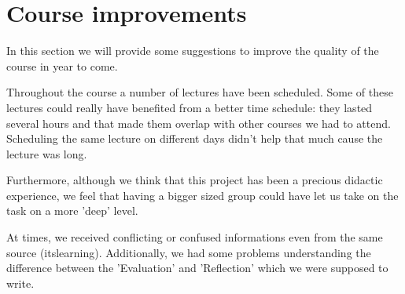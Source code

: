 \section{Course improvements}

In this section we will provide some suggestions to improve the quality of the course in year to come.

Throughout the course a number of lectures have been scheduled.
Some of these lectures could really have benefited from a better time schedule:
they lasted several hours and that made them overlap with other courses we had to attend.
Scheduling the same lecture on different days didn't help that much cause the lecture was long.

Furthermore, although we think that this project has been a precious didactic experience, we feel
that having a bigger sized group could have let us take on the task on a more 'deep' level.

At times, we received conflicting or confused informations even from the same source (itslearning).
Additionally, we had some problems understanding the difference between the 'Evaluation' and 'Reflection'
which we were supposed to write.




